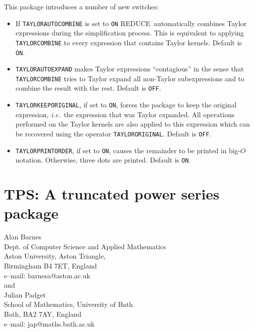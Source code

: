 \documentclass[11pt,letterpaper]{book}
\makeatletter
\newcommand{\REDUCE}{REDUCE}
\newcommand{\underscore}{\_}
\newcommand{\ttindex}[1]{{\renewcommand{\_}{\protect\underscore}%
                          \index{#1@{\tt #1}}}}
\makeatother
\begin{document}
This package introduces a number of new switches:
\begin{itemize}

\item If \verb|TAYLORAUTOCOMBINE| is set to \verb|ON| \REDUCE\
    automatically combines Taylor expressions during the simplification
    process.  This is equivalent to applying \verb|TAYLORCOMBINE| to
    every expression that contains Taylor kernels.
    Default is \verb|ON|.

\item \verb|TAYLORAUTOEXPAND| makes Taylor expressions ``contagious''
    in the sense that \verb|TAYLORCOMBINE| tries to Taylor expand
    all non-Taylor subexpressions and to combine the result with the
    rest. Default is \verb|OFF|.

\item \verb|TAYLORKEEPORIGINAL|, if set to \verb|ON|, forces the
    package to keep the original expression, {\em i.e.\ }the expression
    that was Taylor expanded.  All operations performed on the
    Taylor kernels are also applied to this expression  which can
    be recovered using the operator \verb|TAYLORORIGINAL|.
    Default is \verb|OFF|.

\item \verb|TAYLORPRINTORDER|, if set to \verb|ON|, causes the
    remainder to be printed in big-$O$ notation.  Otherwise, three
    dots are printed. Default is \verb|ON|.

\end{itemize}

\chapter{TPS: A truncated power series package}
\label{TPS}

{\footnotesize
\begin{center}
Alan Barnes \\
Dept. of Computer Science and Applied Mathematics \\
Aston University, Aston Triangle, \\
Birmingham B4 7ET, England \\[0.05in]
e--mail: barnesa@aston.ac.uk \\[0.1in]
and \\[0.1in]
Julian Padget \\
School of Mathematics, University of Bath \\
Bath, BA2 7AY, England \\[0.05in]
e--mail: jap@maths.bath.ac.uk
\end{center}
}
\ttindex{TPS}\ttindex{PS}
\end{document}
